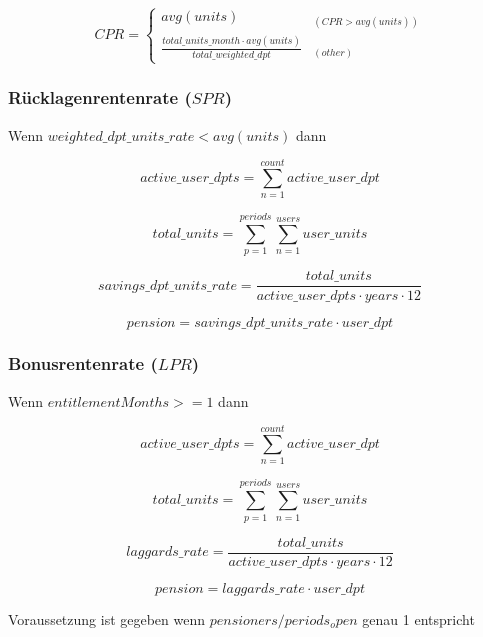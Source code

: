 \begin{equation}
CPR = \begin{cases} 
	avg(units) & _{(CPR > avg(units))} \\
	\frac{total\_units\_month  \cdot avg(units)} 
		{total\_weighted\_dpt} & _{(other)}
\end{cases}
\end{equation}





\subsubsection*{Rücklagenrentenrate ($SPR$)}

Wenn $weighted\_dpt\_units\_rate < avg(units)$ dann 

\begin{equation}
	active\_user\_dpts = 
	\sum_{n=1}^{count} active\_user\_dpt
\end{equation}

\begin{equation}
	total\_units = 	
	\sum_{p=1}^{periods} \sum_{n=1}^{users} user\_units	
\end{equation}

\begin{equation}
	savings\_dpt\_units\_rate = 	
	\frac{total\_units} 
	{active\_user\_dpts \cdot years \cdot 12}		
\end{equation}

\begin{equation}
	pension = savings\_dpt\_units\_rate \cdot user\_dpt
\end{equation}


\subsubsection*{Bonusrentenrate ($LPR$)}

Wenn $entitlementMonths >= 1$ dann 

\begin{equation*}
	active\_user\_dpts = 
	\sum_{n=1}^{count} active\_user\_dpt
\end{equation*}

\begin{equation*}
	total\_units = 	
	\sum_{p=1}^{periods} \sum_{n=1}^{users} user\_units	
\end{equation*}

\begin{equation*}
	laggards\_rate = 	
	\frac{total\_units} 
	{active\_user\_dpts \cdot years \cdot 12}		
\end{equation*}

\begin{equation*}
	pension = laggards\_rate \cdot user\_dpt
\end{equation*}


Voraussetzung ist gegeben wenn $pensioners / periods_open$ genau 1 entspricht
